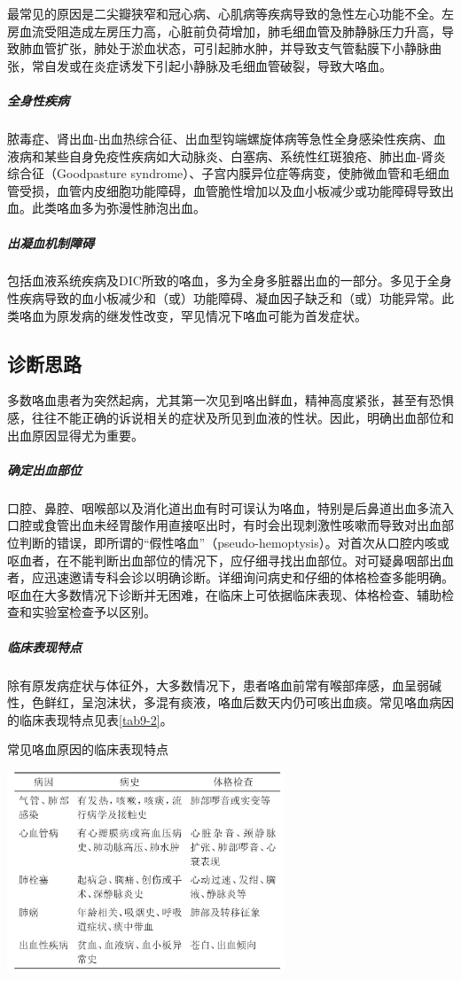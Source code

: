 最常见的原因是二尖瓣狭窄和冠心病、心肌病等疾病导致的急性左心功能不全。左房血流受阻造成左房压力高，心脏前负荷增加，肺毛细血管及肺静脉压力升高，导致肺血管扩张，肺处于淤血状态，可引起肺水肿，并导致支气管黏膜下小静脉曲张，常自发或在炎症诱发下引起小静脉及毛细血管破裂，导致大咯血。

\subparagraph{全身性疾病}

脓毒症、肾出血-出血热综合征、出血型钩端螺旋体病等急性全身感染性疾病、血液病和某些自身免疫性疾病如大动脉炎、白塞病、系统性红斑狼疮、肺出血-肾炎综合征（Goodpasture
syndrome）、子宫内膜异位症等病变，使肺微血管和毛细血管受损，血管内皮细胞功能障碍，血管脆性增加以及血小板减少或功能障碍导致出血。此类咯血多为弥漫性肺泡出血。

\subparagraph{出凝血机制障碍}

包括血液系统疾病及DIC所致的咯血，多为全身多脏器出血的一部分。多见于全身性疾病导致的血小板减少和（或）功能障碍、凝血因子缺乏和（或）功能异常。此类咯血为原发病的继发性改变，罕见情况下咯血可能为首发症状。

\subsection{诊断思路}

多数咯血患者为突然起病，尤其第一次见到咯出鲜血，精神高度紧张，甚至有恐惧感，往往不能正确的诉说相关的症状及所见到血液的性状。因此，明确出血部位和出血原因显得尤为重要。

\subparagraph{确定出血部位}

口腔、鼻腔、咽喉部以及消化道出血有时可误认为咯血，特别是后鼻道出血多流入口腔或食管出血未经胃酸作用直接呕出时，有时会出现刺激性咳嗽而导致对出血部位判断的错误，即所谓的“假性咯血”（pseudo-hemoptysis）。对首次从口腔内咳或呕血者，在不能判断出血部位的情况下，应仔细寻找出血部位。对可疑鼻咽部出血者，应迅速邀请专科会诊以明确诊断。详细询问病史和仔细的体格检查多能明确。呕血在大多数情况下诊断并无困难，在临床上可依据临床表现、体格检查、辅助检查和实验室检查予以区别。

\subparagraph{临床表现特点}

除有原发病症状与体征外，大多数情况下，患者咯血前常有喉部痒感，血呈弱碱性，色鲜红，呈泡沫状，多混有痰液，咯血后数天内仍可咳出血痰。常见咯血病因的临床表现特点见表\ref{tab9-2}。

\begin{table}[htbp]
\centering
\caption{常见咯血原因的临床表现特点}
\label{tab9-2}
\includegraphics[width=3.26042in,height=2.38542in]{./images/Image00046.jpg}
\end{table}

